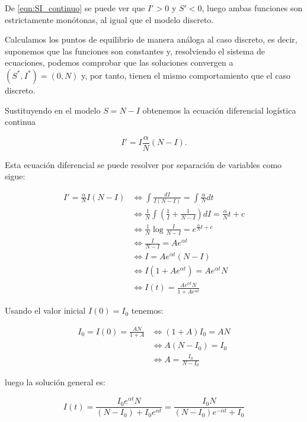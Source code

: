 De \eqref{eqn:SI_continuo} se puede ver que $I'>0$ y $S'<0$, luego ambas funciones son estrictamente monótonas, al igual que el modelo discreto.

Calculamos los puntos de equilibrio de manera análoga al caso discreto, es decir, suponemos que las funciones son constantes y, resolviendo el sistema de ecuaciones, podemos comprobar que las soluciones convergen a $(S^*,I^*)=(0,N)$ y, por tanto, tienen el mismo comportamiento que el caso discreto.

Sustituyendo en el modelo $S=N-I$ obtenemos la ecuación diferencial logística continua

$$I' = I\frac{\alpha}{N}(N-I).$$

Esta ecuación diferencial se puede resolver por separación de variables como sigue:

\begin{equation}
\begin{aligned}
I'=\frac{\alpha}{N}I(N-I) & \Leftrightarrow \int \frac{dI}{I(N-I)} = \int \frac{\alpha}{N} dt \\
& \Leftrightarrow \frac{1}{N}\int \left(\frac{1}{I}+\frac{1}{N-I}\right) dI = \frac{\alpha}{N}t+c \\
& \Leftrightarrow  \frac{1}{N}\log{\frac{I}{N-I}} = e^{\frac{\alpha}{N}t+c} \\
& \Leftrightarrow  \frac{I}{N-I} = Ae^{\alpha t} \\
& \Leftrightarrow  I = Ae^{\alpha t}(N-I) \\
& \Leftrightarrow  I(1+Ae^{\alpha t}) = Ae^{\alpha t}N \\
& \Leftrightarrow  I(t) = \frac{Ae^{\alpha t}N}{1+Ae^{\alpha t} }
\end{aligned}
\end{equation}

Usando el valor inicial $I(0)=I_0$ tenemos:

\begin{equation}
\begin{aligned}
I_0 = I(0) = \frac{AN}{1+A} & \Leftrightarrow (1+A)I_0 = AN \\
& \Leftrightarrow A(N-I_0) = I_0 \\
& \Leftrightarrow A = \frac{I_0}{N-I_0}
\end {aligned}
\end{equation}

luego la solución general es:

$$I(t) = \frac{I_0e^{\alpha t}N}{(N-I_0)+I_0e^{\alpha t}} = \frac{I_0N}{(N-I_0)e^{-\alpha t}+I_0}$$

